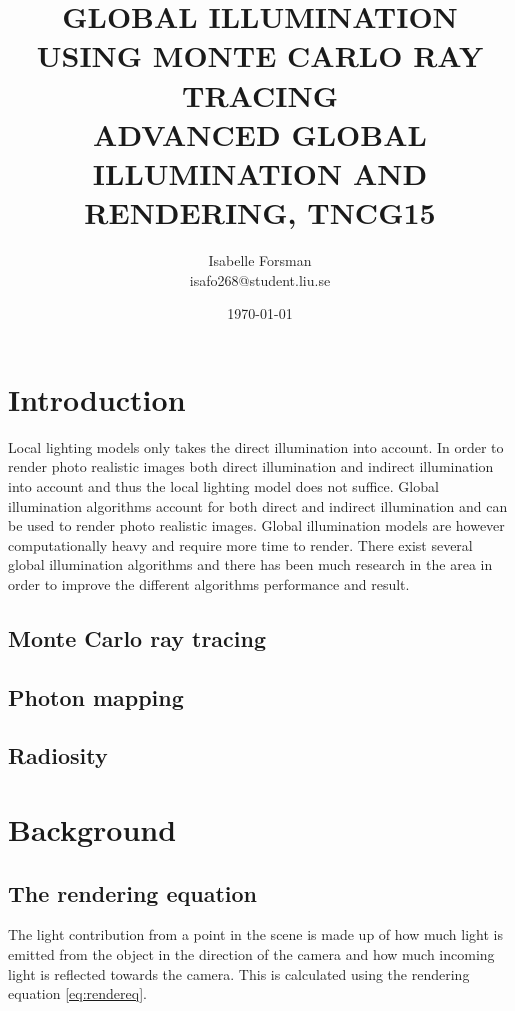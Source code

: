 \documentclass[twocolumn]{article}
\title{GLOBAL ILLUMINATION USING MONTE CARLO RAY TRACING \\ {\small\vspace{-1.0em} ADVANCED GLOBAL ILLUMINATION AND RENDERING, TNCG15}}
\author{Isabelle Forsman\\isafo268@student.liu.se}
\date{\today}
\begin{document}
\maketitle

\begin{abstract}

\end{abstract}


\section{Introduction}
Local lighting models only takes the direct illumination into account. In order to render photo realistic images both direct illumination and indirect illumination into account and thus the local lighting model does not suffice. Global illumination algorithms account for both direct and indirect illumination and can be used to render photo realistic images. Global illumination models are however computationally heavy and require more time to render. There exist several global illumination algorithms and there has been much research in the area in order to improve the different algorithms performance and result.

\subsection{Monte Carlo ray tracing}

\subsection{Photon mapping}

\subsection{Radiosity}

\section{Background}

\subsection{The rendering equation}

The light contribution from a point in the scene is made up of how much light is emitted from the object in the direction of the camera and how much incoming light is reflected towards the camera. This is calculated using the rendering equation \ref{eq:rendereq}.
\end{document}
